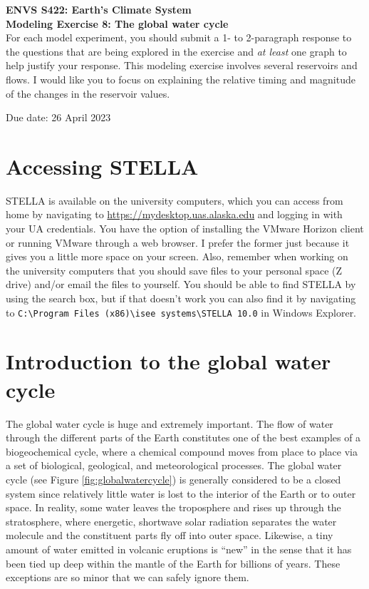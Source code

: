 \documentclass[11pt,letterpaper]{article}
\begin{document}
\setlength{\parindent}{0in}
\newcommand{\tablespace}[0]{\vspace{8pt}}
\textbf{ENVS S422: Earth's Climate System\\
Modeling Exercise 8: The global water cycle}\\%

For each model experiment, you should submit a 1- to 2-paragraph response to the questions that are being explored in the exercise and \textit{at least} one graph to help justify your response. This modeling exercise involves several reservoirs and flows. I would like you to focus on explaining the relative timing and magnitude of the changes in the reservoir values.

Due date: 26 April 2023

\section{Accessing STELLA}
STELLA is available on the university computers, which you can access from home by navigating to \url{https://mydesktop.uas.alaska.edu} and logging in with your UA credentials. You have the option of installing the VMware Horizon client or running VMware through a web browser. I prefer the former just because it gives you a little more space on your screen. Also, remember when working on the university computers that you should save files to your personal space (Z drive) and/or email the files to yourself. You should be able to find STELLA by using the search box, but if that doesn't work you can also find it by navigating to \verb+C:\Program Files (x86)\isee systems\STELLA 10.0+ in Windows Explorer.

\section{Introduction to the global water cycle}
The global water cycle is huge and extremely important. The flow of water through the different parts of the Earth constitutes one of the best examples of a biogeochemical cycle, where a chemical compound moves from place to place via a set of biological, geological, and meteorological processes. The global water cycle (see Figure \ref{fig:globalwatercycle}) is generally considered to be a closed system since relatively little water is lost to the interior of the Earth or to outer space. In reality, some water leaves the troposphere and rises up through the stratosphere, where energetic, shortwave solar radiation separates the water molecule and the constituent parts fly off into outer space. Likewise, a tiny amount of water emitted in volcanic eruptions is ``new'' in the sense that it has been tied up deep within the mantle of the Earth for billions of years. These exceptions are so minor that we can safely ignore them.
\end{document}
